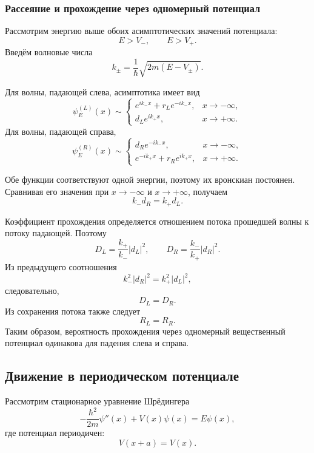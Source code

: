 \documentclass[12pt,a4paper]{article}
\begin{document}
\subsubsection{Рассеяние и прохождение через одномерный потенциал}

Рассмотрим энергию выше обоих асимптотических значений потенциала:
\[
    E>V_-,
    \qquad
    E>V_+.
\]
Введём волновые числа
\[
    \boxed{
        k_\pm
        =
        \frac{1}{\hbar}
        \sqrt{2m(E-V_\pm)}
    }.
\]

Для волны, падающей слева, асимптотика имеет вид
\[
    \psi_E^{(L)}(x)
    \sim
    \begin{cases}
        e^{ik_-x}+r_L e^{-ik_-x},
            & x\to-\infty,\\[1mm]
        d_L e^{ik_+x},
            & x\to+\infty.
    \end{cases}
\]
Для волны, падающей справа,
\[
    \psi_E^{(R)}(x)
    \sim
    \begin{cases}
        d_R e^{-ik_-x},
            & x\to-\infty,\\[1mm]
        e^{-ik_+x}+r_R e^{ik_+x},
            & x\to+\infty.
    \end{cases}
\]

Обе функции соответствуют одной энергии, поэтому их вронскиан
постоянен. Сравнивая его значения при $x\to-\infty$ и
$x\to+\infty$, получаем
\[
    \boxed{
        k_-d_R=k_+d_L
    }.
\]

Коэффициент прохождения определяется отношением потока прошедшей волны
к потоку падающей. Поэтому
\[
    D_L
    =
    \frac{k_+}{k_-}|d_L|^2,
    \qquad
    D_R
    =
    \frac{k_-}{k_+}|d_R|^2.
\]
Из предыдущего соотношения
\[
    k_-^2|d_R|^2
    =
    k_+^2|d_L|^2,
\]
следовательно,
\[
    \boxed{
        D_L=D_R
    }.
\]
Из сохранения потока также следует
\[
    \boxed{
        R_L=R_R
    }.
\]
Таким образом, вероятность прохождения через одномерный вещественный
потенциал одинакова для падения слева и справа.


\subsection{Движение в периодическом потенциале}

Рассмотрим стационарное уравнение Шрёдингера
\[
    -\frac{\hbar^2}{2m}\psi''(x)
    +
    V(x)\psi(x)
    =
    E\psi(x),
\]
где потенциал периодичен:
\[
    \boxed{
        V(x+a)=V(x)
    }.
\]
\end{document}
